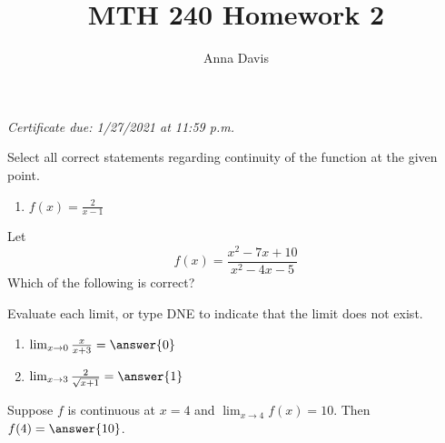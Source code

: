 \documentclass{ximera}
\author{Anna Davis} \title{MTH 240 Homework 2}
\begin{document}
\begin{abstract}

\end{abstract}
\maketitle
 \textit{Certificate due: 1/27/2021 at 11:59 p.m.}
 \begin{problem}\label{prob:240hom2prob1}
 Select all correct statements regarding continuity of the function at the given point.
 \begin{enumerate}
     \item 
     $f(x)=\frac{2}{x-1}$
     \begin{selectAll}  
  \end{selectAll}  
     
 \end{enumerate}
 \end{problem}
 
 \begin{problem}\label{prob:240hom2prob2}
 Let $$f(x)=\frac{x^2-7x+10}{x^2-4x-5}$$  
 Which of the following is correct?
 \begin{multipleChoice}  
 \end{multipleChoice}
 \end{problem}
 
\begin{problem}\label{prob:240hom2prob3}
Evaluate each limit, or type DNE to indicate that the limit does not exist.
\begin{enumerate}
    \item
$\lim_{x\rightarrow 0} \frac{x}{x+3}=\answer{0}$
\item 
$\lim_{x\to 3}\frac{2}{\sqrt{x+1}}=\answer{1}$
\end{enumerate}
 
\end{problem}

\begin{problem}\label{prob:240hom2prob4}
Suppose $f$ is continuous at $x=4$ and $\lim_{x\to 4}f(x)=10$.
Then $f(4)=\answer{10}$.
\end{problem}
\end{document}
